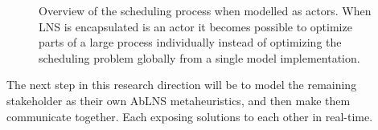 \begin{figure}[H]
	\centering
	
	\caption{
		Overview of the scheduling process when modelled as actors. When LNS is encapsulated 
		is an actor it becomes possible to optimize parts of a large process individually instead of 
		optimizing the scheduling problem globally from a single model implementation.
	}
	\label{fig:ordinator-architecture}
\end{figure}
The next step in this research direction will be to model the remaining stakeholder as their own 
AbLNS metaheuristics, and then make them communicate together. Each exposing solutions to each 
other in real-time.
